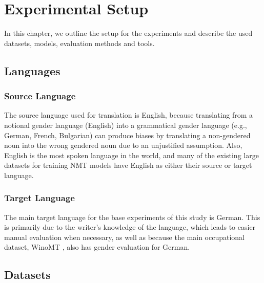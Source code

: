 \chapter{Experimental Setup}
\label{ch:Setup}

In this chapter, we outline the setup for the experiments and describe the used datasets, models, evaluation methods and tools.

\section{Languages}
\label{sec:Setup:Languages}


\subsection{Source Language} 
The source language used for translation is English, because translating from a notional gender language (English) into a grammatical gender language (e.g., German, French, Bulgarian) can produce biases by translating a non-gendered noun into the wrong gendered noun due to an unjustified assumption. Also, English is the most spoken language in the world, and many of the existing large datasets for training NMT models have English as either their source or target language.

\subsection{Target Language} 
The main target language for the base experiments of this study is German. This is primarily due to the writer's knowledge of the language, which leads to easier manual evaluation when necessary, as well as because the main occupational dataset, WinoMT \parencite{Stanovsky_2019}, also has gender evaluation for German.


\section{Datasets}
\label{sec:Setup:Datasets}

